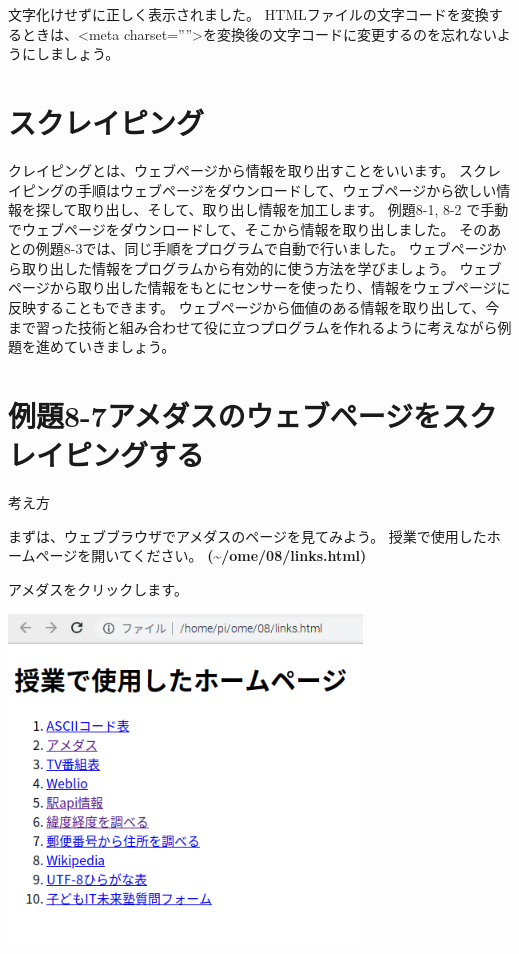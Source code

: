 \documentclass[a4paper,12pt,dvipdfmx]{jarticle}
\begin{document}
\bigskip


\bigskip

文字化けせずに正しく表示されました。
HTMLファイルの文字コードを変換するときは、{\textless}meta
charset=””{\textgreater}を変換後の文字コードに変更するのを忘れないようにしましょう。

\clearpage\section{スクレイピング}
クレイピングとは、ウェブページから情報を取り出すことをいいます。
スクレイピングの手順はウェブページをダウンロードして、ウェブページから欲しい情報を探して取り出し、そして、取り出し情報を加工します。
例題8-1,
8-2%
で手動でウェブページをダウンロードして、そこから情報を取り出しました。
そのあとの例題8-3では、同じ手順をプログラムで自動で行いました。
ウェブページから取り出した情報をプログラムから有効的に使う方法を学びましょう。
ウェブページから取り出した情報をもとにセンサーを使ったり、情報をウェブページに反映することもできます。
ウェブページから価値のある情報を取り出して、今まで習った技術と組み合わせて役に立つプログラムを作れるように考えながら例題を進めていきましょう。



\bigskip

\clearpage\section{例題8-7アメダスのウェブページをスクレイピングする}
考え方

まずは、ウェブブラウザでアメダスのページを見てみよう。
授業で使用したホームページを開いてください。
\textbf{(\~{}/ome/08/links.html)}

アメダスをクリックします。 



\begin{center}
\includegraphics[width=9.398cm,height=8.784cm]{textbook-img017.png}

\end{center}
\end{document}
